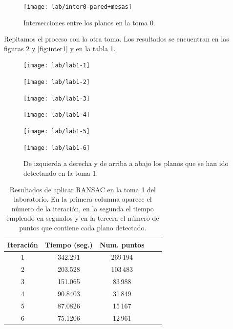 \begin{figure}[h!]
		\centering
		\texttt{[image: lab/inter0-pared+mesas]} 
		\caption{Intersecciones entre los planos en la toma 0.}
		\label{fig:inter0}
\end{figure}

Repitamos el proceso con la otra toma. Los resultados se encuentran en las figuras \ref{fig:planos-lab1} y \ref{fig:inter1} y en la tabla \ref{table:res-lab1}. \\

\begin{figure}[h!]
	\begin{minipage}{0.5\textwidth}
		\centering
		\texttt{[image: lab/lab1-1]} 
	\end{minipage}
	\begin{minipage}{0.5\textwidth}
		\centering
		\texttt{[image: lab/lab1-2]} 
	\end{minipage}
	\begin{minipage}{0.5\textwidth}
		\centering
		\texttt{[image: lab/lab1-3]} 
	\end{minipage}
	\begin{minipage}{0.5\textwidth}
		\centering
		\texttt{[image: lab/lab1-4]} 
	\end{minipage}
	\begin{minipage}{0.5\textwidth}
		\centering
		\texttt{[image: lab/lab1-5]} 
	\end{minipage}
	\begin{minipage}{0.5\textwidth}
		\centering
		\texttt{[image: lab/lab1-6]} 
	\end{minipage}
	\caption{De izquierda a derecha y de arriba a abajo los planos que se han ido detectando en la toma 1.}
	\label{fig:planos-lab1}
\end{figure}

\begin{table}[h!]
	\centering
	\begin{tabular}{| c | c | c | c | c |} 
		\hline
		Iteración  & Tiempo (seg.) & Num. puntos \\
		\hline
		1 & 342.291 & 269\,194 \\				  
		2 & 203.528  & 103\,483  \\	
		3 & 151.065 &  83\,988 \\
		4 & 90.8403 &  31\,849\\
		5 & 87.0826 & 15\,167 \\
		6 & 75.1206 & 12\,961 \\
		\hline
	\end{tabular}
	\caption{Resultados de aplicar RANSAC en la toma 1 del laboratorio. En la primera columna aparece el número de la iteración, en la segunda el tiempo empleado en segundos y en la tercera el número de puntos que contiene cada plano detectado.}
	\label{table:res-lab1}
\end{table}

